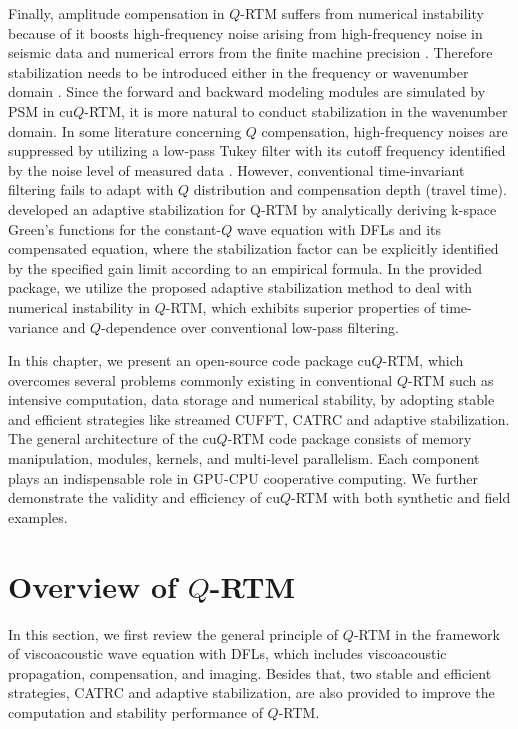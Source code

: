 Finally, amplitude compensation in $Q$-RTM suffers from numerical instability because of it boosts high-frequency noise arising from high-frequency noise in seismic data and numerical errors from the finite machine precision \citep{wang2009seismic, Zhu2014Q, yang2016wavefield, zhao2017method}. Therefore stabilization needs to be introduced either in the frequency or wavenumber domain \citep{Kalimeris2012Photoacoustic, Ammari2013Time}. Since the forward and backward modeling modules are simulated by PSM in cu$Q$-RTM, it is more natural to conduct stabilization in the wavenumber domain. In some literature concerning $Q$ compensation, high-frequency noises are suppressed by utilizing a low-pass Tukey filter with its cutoff frequency identified by the noise level of measured data \citep{Treeby2010Photoacoustic, Zhu2014Q,Li2016Efficient}. However, conventional time-invariant filtering fails to adapt with $Q$ distribution and compensation depth (travel time). \cite{wang2018adaptive} developed an adaptive stabilization for Q-RTM by analytically deriving k-space Green's functions for the constant-$Q$ wave equation with DFLs and its compensated equation, where the stabilization factor can be explicitly identified by the specified gain limit according to an empirical formula. In the provided package, we utilize the proposed adaptive stabilization method to deal with numerical instability in $Q$-RTM, which exhibits superior properties of time-variance and $Q$-dependence over conventional low-pass filtering. 

In this chapter, we present an open-source code package cu$Q$-RTM, which overcomes several problems commonly existing in conventional $Q$-RTM such as intensive computation, data storage and numerical stability, by adopting stable and efficient strategies like streamed CUFFT, CATRC and adaptive stabilization. The general architecture of the cu$Q$-RTM code package consists of memory manipulation, modules, kernels, and multi-level parallelism. Each component plays an indispensable role in GPU-CPU cooperative computing. We further demonstrate the validity and efficiency of cu$Q$-RTM with both synthetic and field examples. 

\section{Overview of $Q$-RTM}

In this section, we first review the general principle of $Q$-RTM in the framework of viscoacoustic wave equation with DFLs, which includes viscoacoustic propagation, compensation, and imaging. Besides that, two stable and efficient strategies, CATRC and adaptive stabilization, are also provided to improve the computation and stability performance of $Q$-RTM.

